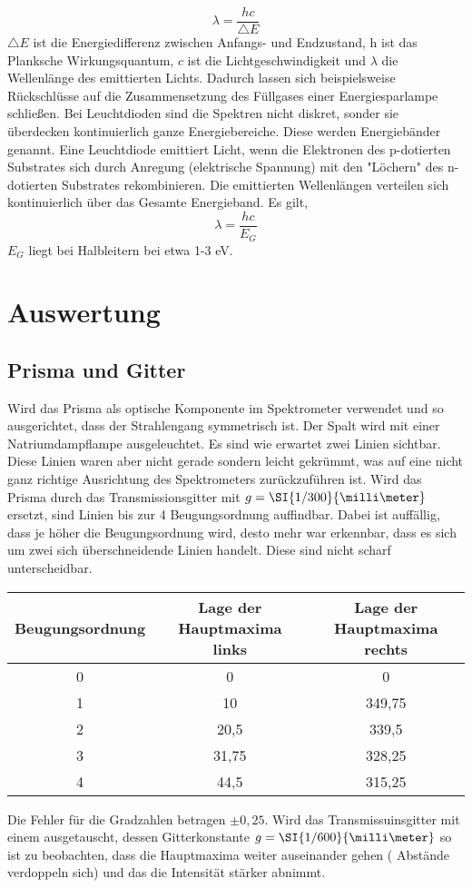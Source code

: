 \begin{equation}
\lambda=\frac{hc}{\triangle E}
\end{equation}
$ \triangle E $ ist die Energiedifferenz zwischen Anfangs- und Endzustand, $ \textit{h} $ ist das Planksche Wirkungsquantum, $ \textit{c} $ ist die Lichtgeschwindigkeit und $ \lambda $ die Wellenlänge des emittierten Lichts. 
Dadurch lassen sich beispielsweise Rückschlüsse auf die Zusammensetzung des Füllgases einer Energiesparlampe schließen.
Bei Leuchtdioden sind die Spektren nicht diskret, sonder sie überdecken kontinuierlich ganze Energiebereiche. Diese werden Energiebänder genannt. 
Eine Leuchtdiode emittiert Licht, wenn die Elektronen des p-dotierten Substrates sich durch Anregung (elektrische Spannung) mit den "Löchern" des n-dotierten Substrates rekombinieren. Die emittierten Wellenlängen verteilen sich kontinuierlich über das Gesamte Energieband. Es gilt,
\begin{equation}
\lambda=\frac{hc}{E_{G}}
\end{equation}
$ E_{G} $ liegt bei Halbleitern bei etwa 1-3 eV.

\newpage
\section{Auswertung}
\subsection{Prisma und Gitter}
Wird das Prisma als optische Komponente im Spektrometer verwendet und so ausgerichtet, dass der Strahlengang symmetrisch ist. Der Spalt wird mit einer  Natriumdampflampe ausgeleuchtet. Es sind wie erwartet zwei Linien sichtbar. Diese Linien waren aber nicht gerade sondern leicht gekrümmt, was auf eine nicht ganz richtige Ausrichtung des Spektrometers zurückzuführen ist.
Wird das Prisma durch das Transmissionsgitter mit $ g=\SI{1/300}{\milli\meter} $  ersetzt, sind Linien bis zur 4 Beugungsordnung auffindbar. Dabei ist auffällig, dass je höher die Beugungsordnung wird, desto mehr war erkennbar, dass es sich um zwei sich überschneidende Linien handelt. Diese sind nicht scharf unterscheidbar.
\begin{tabular}{|c|c|c|}
\hline 
Beugungsordnung & Lage der Hauptmaxima links & Lage der Hauptmaxima rechts \\ 
\hline 
0 & 0 & 0 \\ 
\hline 
1 & 10 & 349,75 \\ 
\hline 
2 & 20,5 & 339,5 \\ 
\hline 
3 & 31,75 & 328,25 \\ 
\hline 
4 & 44,5 & 315,25 \\ 
\hline 
\end{tabular} 
Die Fehler für die Gradzahlen betragen $ \pm 0,25 $.
Wird das Transmissuinsgitter mit einem ausgetauscht, dessen Gitterkonstante $ g=\SI{1/600}{\milli\meter} $ so ist zu beobachten, dass die Hauptmaxima weiter auseinander gehen ( Abstände verdoppeln sich) und das die Intensität stärker abnimmt.


